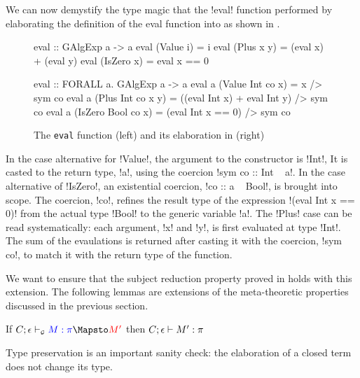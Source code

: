 \documentclass[screen,nonacm,manuscript,review]{acmart} %
\begin{document}
We can now demystify the type magic that the !eval! function
performed by elaborating the definition of the eval function into \SFC as shown in .

\begin{figure}[h]
\begin{minipage}[ht]{0.5\linewidth}
\begin{CenteredBox}
\begin{code}
eval :: GAlgExp a -> a
eval (Value i) = i
eval (Plus x y)
   = (eval x) + (eval y)
eval (IsZero x)
   = eval x == 0
\end{code}
\end{CenteredBox}
\end{minipage}%
\begin{minipage}[ht]{0.5\linewidth}
\begin{CenteredBox}
\begin{code}
eval :: FORALL a. GAlgExp a -> a
eval a (Value Int co x) = x /> sym co
eval a (Plus Int co x y)
   = ((eval Int x) + eval Int y) /> sym co
eval a (IsZero Bool co x)
   = (eval Int x == 0) /> sym co
\end{code}
\end{CenteredBox}
\end{minipage}
\caption[Encoding eval]{The \texttt{eval} function (left) and its elaboration in \SFC (right)}
 \label{fig:encoding-eval}
\end{figure}

In the case alternative for !Value!, the argument to the constructor is !Int!,
It is casted to the return type, !a!, using the coercion !sym co :: Int ~ a!.
In the case alternative of !IsZero!, an existential
coercion, !co :: a ~ Bool!, is brought into scope. The coercion, !co!, refines
the result type of the expression !(eval Int x == 0)!
from the actual type !Bool! to the generic variable !a!. The !Plus! case
can be read systematically: each argument,
!x! and !y!, is first evaluated at type !Int!. The sum of the evaulations
is returned after casting it with the coercion, !sym co!, to match it
with the return type of the function.

We want to ensure that the subject reduction property proved
in  holds with this extension.
The following lemmas are extensions of the meta-theoretic properties
discussed in the previous section.

\begin{lemma}\label{lem:gadt-type-preservation}
 If $\GTranslate C \empt \Tm \pi {\Tm'}$ then $C;\epsilon \vdash M' : \pi$
\end{lemma}
Type preservation is an important sanity check: the elaboration of a closed term
does not change its type.
\end{document}

